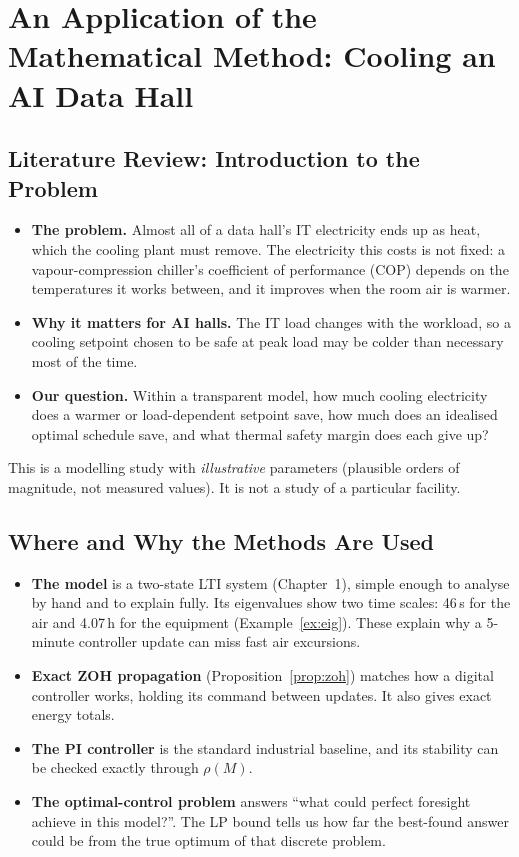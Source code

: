 \documentclass[12pt,a4paper]{report}
\theoremstyle{definition}
\begin{document}
\chapter{An Application of the Mathematical Method: Cooling an AI Data Hall}

\section{Literature Review: Introduction to the Problem}
\begin{itemize}
\item \textbf{The problem.} Almost all of a data hall's IT electricity ends up as heat, which the cooling plant must remove. The electricity this costs is not fixed: a vapour-compression chiller's coefficient of performance (COP) depends on the temperatures it works between, and it improves when the room air is warmer.
\item \textbf{Why it matters for AI halls.} The IT load changes with the workload, so a cooling setpoint chosen to be safe at peak load may be colder than necessary most of the time.
\item \textbf{Our question.} Within a transparent model, how much cooling electricity does a warmer or load-dependent setpoint save, how much does an idealised optimal schedule save, and what thermal safety margin does each give up?
\end{itemize}
This is a modelling study with \emph{illustrative} parameters (plausible orders of magnitude, not measured values). It is not a study of a particular facility.

\section{Where and Why the Methods Are Used}
\begin{itemize}
\item \textbf{The model} is a two-state LTI system (Chapter~1), simple enough to analyse by hand and to explain fully. Its eigenvalues show two time scales: 46\,s for the air and 4.07\,h for the equipment (Example~\ref{ex:eig}). These explain why a 5-minute controller update can miss fast air excursions.
\item \textbf{Exact ZOH propagation} (Proposition~\ref{prop:zoh}) matches how a digital controller works, holding its command between updates. It also gives exact energy totals.
\item \textbf{The PI controller} is the standard industrial baseline, and its stability can be checked exactly through $\rho(M)$.
\item \textbf{The optimal-control problem} answers ``what could perfect foresight achieve in this model?''. The LP bound tells us how far the best-found answer could be from the true optimum of that discrete problem.
\end{itemize}
\end{document}
